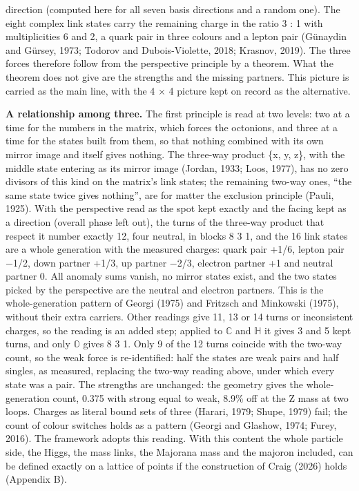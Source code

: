 \documentclass[
  11pt,
]{article}
\begin{document}
direction (computed here for all seven basis directions and a random one). The eight complex link states carry the remaining charge in the ratio 3 : 1 with multiplicities 6 and 2, a quark pair in three colours and a lepton pair (Günaydin and Gürsey, 1973; Todorov and Dubois-Violette, 2018; Krasnov, 2019). The three forces therefore follow from the perspective principle by a theorem. What the theorem does not give are the strengths and the missing partners. This picture is carried as the main line, with the 4 \ensuremath{\times} 4 picture kept on record as the alternative.

\textbf{A relationship among three.} The first principle is read at two levels: two at a time for the numbers in the matrix, which forces the octonions, and three at a time for the states built from them, so that nothing combined with its own mirror image and itself gives nothing. The three-way product \{x, y, z\}, with the middle state entering as its mirror image (Jordan, 1933; Loos, 1977), has no zero divisors of this kind on the matrix's link states; the remaining two-way ones, ``the same state twice gives nothing'', are for matter the exclusion principle (Pauli, 1925). With the perspective read as the spot kept exactly and the facing kept as a direction (overall phase left out), the turns of the three-way product that respect it number exactly 12, four neutral, in blocks 8 \textbar{} 3 \textbar{} 1, and the 16 link states are a whole generation with the measured charges: quark pair +1/6, lepton pair \ensuremath{-}1/2, down partner +1/3, up partner \ensuremath{-}2/3, electron partner +1 and neutral partner 0. All anomaly sums vanish, no mirror states exist, and the two states picked by the perspective are the neutral and electron partners. This is the whole-generation pattern of Georgi (1975) and Fritzsch and Minkowski (1975), without their extra carriers. Other readings give 11, 13 or 14 turns or inconsistent charges, so the reading is an added step; applied to \ensuremath{\mathbb{C}} and \ensuremath{\mathbb{H}} it gives 3 and 5 kept turns, and only \ensuremath{\mathbb{O}} gives 8 \textbar{} 3 \textbar{} 1. Only 9 of the 12 turns coincide with the two-way count, so the weak force is re-identified: half the states are weak pairs and half singles, as measured, replacing the two-way reading above, under which every state was a pair. The strengths are unchanged: the geometry gives the whole-generation count, 0.375 with strong equal to weak, 8.9\% off at the Z mass at two loops. Charges as literal bound sets of three (Harari, 1979; Shupe, 1979) fail; the count of colour switches holds as a pattern (Georgi and Glashow, 1974; Furey, 2016). The framework adopts this reading. With this content the whole particle side, the Higgs, the mass links, the Majorana mass and the majoron included, can be defined exactly on a lattice of points if the construction of Craig (2026) holds (Appendix B).
\end{document}
